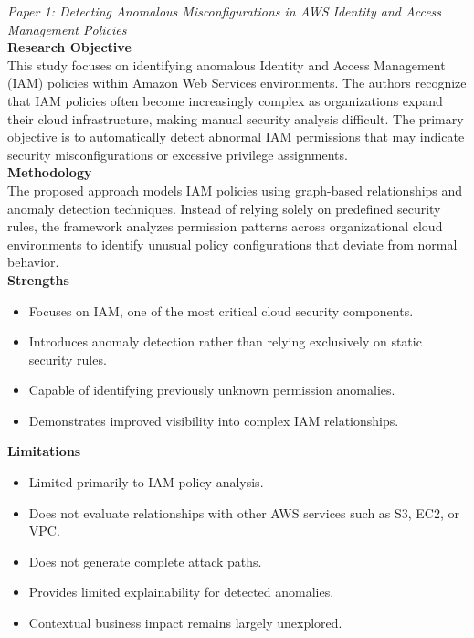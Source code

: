 \emph{Paper 1: Detecting Anomalous Misconfigurations in AWS Identity and Access Management Policies}\\
\textbf{Research Objective}\\
This study focuses on identifying anomalous Identity and Access Management (IAM) policies within Amazon Web Services environments. The authors recognize that IAM policies often become increasingly complex as organizations expand their cloud infrastructure, making manual security analysis difficult. The primary objective is to automatically detect abnormal IAM permissions that may indicate security misconfigurations or excessive privilege assignments.\\
\textbf{Methodology}\\
The proposed approach models IAM policies using graph-based relationships and anomaly detection techniques. Instead of relying solely on predefined security rules, the framework analyzes permission patterns across organizational cloud environments to identify unusual policy configurations that deviate from normal behavior.\\
\textbf{Strengths}

\begin{itemize}
\tightlist
\item
  Focuses on IAM, one of the most critical cloud security components.\\
\item
  Introduces anomaly detection rather than relying exclusively on static security rules.\\
\item
  Capable of identifying previously unknown permission anomalies.\\
\item
  Demonstrates improved visibility into complex IAM relationships.
\end{itemize}

\textbf{Limitations}

\begin{itemize}
\tightlist
\item
  Limited primarily to IAM policy analysis.\\
\item
  Does not evaluate relationships with other AWS services such as S3, EC2, or VPC.\\
\item
  Does not generate complete attack paths.\\
\item
  Provides limited explainability for detected anomalies.\\
\item
  Contextual business impact remains largely unexplored.
\end{itemize}

